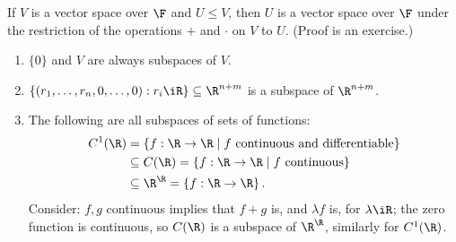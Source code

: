 \begin{lemma}
	If $V$ is a vector space over $\F$ and $U\leq V$, then $U$ is a vector space over $\F$ under the restriction of the operations $+$ and $\cdot$ on $V$ to $U$. (Proof is an exercise.) %
\end{lemma}

\vspace{-6pt}

\begin{examples}
	\begin{enumerate}
		\item $\{0\}$ and $V$ are always subspaces of $V$.
		\item $\left\{(r_1,\ldots,r_n,0,\ldots,0):r_i\iR\right\}\subseteq\R^{n+m}$ is a subspace of $\R^{n+m}$. %
		\item The following are all subspaces of sets of functions:
		\begin{align*}
			C^1(\R)
			&= \left\{f:\R\to\R \mid f \text{ continuous and differentiable}\right\} \\ %
			&\subseteq C(\R) = \left\{f:\R\to\R \mid f \text{ continuous}\right\} \\
			&\subseteq \R^\R = \left\{f:\R\to\R\right\}.
		\end{align*}
		Consider: $f, g$ continuous implies that $f+g$ is, and $\lambda f$ is, for $\lambda \iR$; the zero function is continuous, so $C(\R)$ is a subspace of $\R^\R$, similarly for $C^1(\R)$.


\end{enumerate}
\end{examples}
